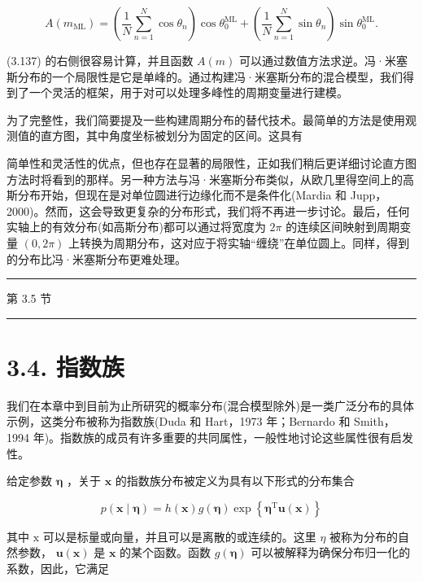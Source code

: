 \documentclass[10pt]{article}
\newcommand{\HRule}{\begin{center}\rule{0.9\linewidth}{0.2mm}\end{center}}
\begin{document}
\[
A\left( {m}_{\mathrm{{ML}}}\right)  = \left( {\frac{1}{N}\mathop{\sum }\limits_{{n = 1}}^{N}\cos {\theta }_{n}}\right) \cos {\theta }_{0}^{\mathrm{{ML}}} + \left( {\frac{1}{N}\mathop{\sum }\limits_{{n = 1}}^{N}\sin {\theta }_{n}}\right) \sin {\theta }_{0}^{\mathrm{{ML}}}. \tag{3.137}
\]

(3.137) 的右侧很容易计算，并且函数 \(A\left( m\right)\) 可以通过数值方法求逆。冯·米塞斯分布的一个局限性是它是单峰的。通过构建冯·米塞斯分布的混合模型，我们得到了一个灵活的框架，用于对可以处理多峰性的周期变量进行建模。

为了完整性，我们简要提及一些构建周期分布的替代技术。最简单的方法是使用观测值的直方图，其中角度坐标被划分为固定的区间。这具有

简单性和灵活性的优点，但也存在显著的局限性，正如我们稍后更详细讨论直方图方法时将看到的那样。另一种方法与冯·米塞斯分布类似，从欧几里得空间上的高斯分布开始，但现在是对单位圆进行边缘化而不是条件化(Mardia 和 Jupp，2000)。然而，这会导致更复杂的分布形式，我们将不再进一步讨论。最后，任何实轴上的有效分布(如高斯分布)都可以通过将宽度为 \({2\pi }\) 的连续区间映射到周期变量 \(\left( {0,{2\pi }}\right)\) 上转换为周期分布，这对应于将实轴“缠绕”在单位圆上。同样，得到的分布比冯·米塞斯分布更难处理。

\HRule

第 3.5 节

\HRule

\section*{3.4. 指数族}

我们在本章中到目前为止所研究的概率分布(混合模型除外)是一类广泛分布的具体示例，这类分布被称为指数族(Duda 和 Hart，1973 年；Bernardo 和 Smith，1994 年)。指数族的成员有许多重要的共同属性，一般性地讨论这些属性很有启发性。

给定参数 \(\mathbf{\eta }\) ，关于 \(\mathbf{x}\) 的指数族分布被定义为具有以下形式的分布集合

\[
p\left( {\mathbf{x} \mid  \mathbf{\eta }}\right)  = h\left( \mathbf{x}\right) g\left( \mathbf{\eta }\right) \exp \left\{  {{\mathbf{\eta }}^{\mathrm{T}}\mathbf{u}\left( \mathbf{x}\right) }\right\}   \tag{3.138}
\]

其中 \(\mathrm{x}\) 可以是标量或向量，并且可以是离散的或连续的。这里 \(\eta\) 被称为分布的自然参数， \(\mathbf{u}\left( \mathbf{x}\right)\) 是 \(\mathbf{x}\) 的某个函数。函数 \(g\left( \mathbf{\eta }\right)\) 可以被解释为确保分布归一化的系数，因此，它满足
\end{document}
